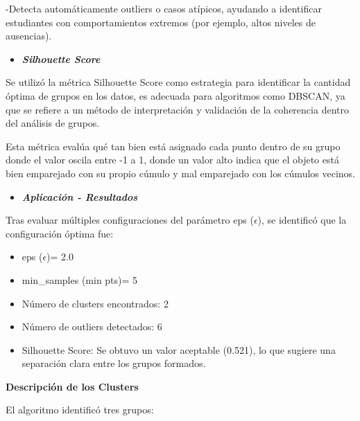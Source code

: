 \documentclass{article}
\begin{document}
-Detecta automáticamente outliers o casos atípicos, ayudando a identificar estudiantes con comportamientos extremos (por ejemplo, altos niveles de ausencias).

\begin{itemize}
    \item \textit{\textbf{{Silhouette Score}}}
\end{itemize}

Se utilizó la métrica Silhouette Score como estrategia para identificar la cantidad óptima de grupos en los datos, es adecuada para algoritmos como DBSCAN, ya que se refiere a un método de interpretación y validación de la coherencia dentro del análisis de grupos.   

Esta métrica evalúa qué tan bien está asignado cada punto dentro de su grupo donde el valor oscila entre -1 a 1, donde un valor alto indica que el objeto está bien emparejado con su propio cúmulo y mal emparejado con los cúmulos vecinos.

\begin{itemize}
    \item \textit{\textbf{Aplicación - Resultados}}
\end{itemize}
Tras evaluar múltiples configuraciones del parámetro eps ($\epsilon$), se identificó que la configuración óptima fue:

\begin{itemize}[label=\--]
    \item eps ($\epsilon$)= 2.0
    \item min\_samples (min pts)= 5
    \item Número de clusters encontrados: 2
    \item Número de outliers detectados: 6
    \item Silhouette Score: Se obtuvo un valor aceptable (0.521), lo que sugiere una separación clara entre los grupos formados.
\end{itemize}


\textbf{Descripción de los Clusters} 


El algoritmo identificó tres grupos:
\end{document}
